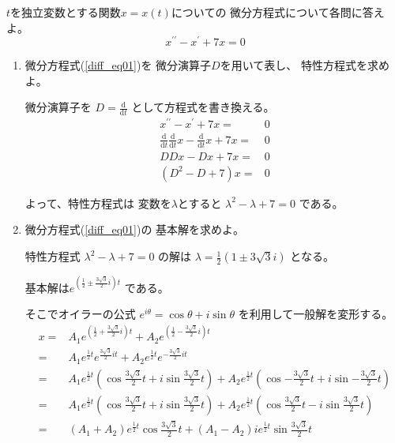 \documentclass[12pt,b5paper]{ltjsarticle}
\begin{document}
$t$を独立変数とする関数$x=x(t)$についての
微分方程式について各問に答えよ。
\begin{equation}
 x^{\prime\prime}- x^{\prime}+7x=0
  \label{diff_eq01}
\end{equation}
\begin{enumerate}
 \item
      微分方程式(\ref{diff_eq01})を
      微分演算子$D$を用いて表し、
      特性方程式を求めよ。

      \dotfill

      微分演算子を
      $D=\frac{\mathrm{d}}{\mathrm{d}t}$
      として方程式を書き換える。
      \begin{align}
       x^{\prime\prime}- x^{\prime}+7x =& 0\\
       \frac{\mathrm{d}}{\mathrm{d}t}\frac{\mathrm{d}}{\mathrm{d}t}x
       -\frac{\mathrm{d}}{\mathrm{d}t}x
       +7x =& 0\\
       DDx-Dx+7x =& 0\\
       (D^2-D+7)x =& 0
      \end{align}

      よって、特性方程式は
      変数を$\lambda$とすると
      $\lambda^2-\lambda+7 = 0$
      である。

      \hrulefill

 \item
      微分方程式(\ref{diff_eq01})の
      基本解を求めよ。

      \dotfill

      特性方程式
      $\lambda^2-\lambda+7 = 0$
      の解は
      $\lambda=\frac{1}{2}\left( 1\pm 3\sqrt{3}i \right)$
      となる。

      基本解は$e^{\left(\frac{1}{2} \pm \frac{3\sqrt{3}}{2}i\right)t}$
      である。

      そこでオイラーの公式
      $e^{i\theta}=\cos{\theta}+i\sin{\theta}$
      を利用して一般解を変形する。
      \begin{align}
       x =& A_1e^{\left(\frac{1}{2} + \frac{3\sqrt{3}}{2}i\right)t}
        +A_2e^{\left(\frac{1}{2} - \frac{3\sqrt{3}}{2}i\right)t}\\
       =& A_1e^{\frac{1}{2}t}e^{\frac{3\sqrt{3}}{2}it}
       + A_2e^{\frac{1}{2}t}e^{-\frac{3\sqrt{3}}{2}it}\\
       =& A_1e^{\frac{1}{2}t}\left(\cos{\frac{3\sqrt{3}}{2}t}+i\sin{\frac{3\sqrt{3}}{2}t}\right)
       +  A_2e^{\frac{1}{2}t}\left(\cos{-\frac{3\sqrt{3}}{2}t}+i\sin{-\frac{3\sqrt{3}}{2}t}\right)\\
       =& A_1e^{\frac{1}{2}t}\left(\cos{\frac{3\sqrt{3}}{2}t}+i\sin{\frac{3\sqrt{3}}{2}t}\right)
       +  A_2e^{\frac{1}{2}t}\left(\cos{\frac{3\sqrt{3}}{2}t}-i\sin{\frac{3\sqrt{3}}{2}t}\right)\\
       =& (A_1+A_2)e^{\frac{1}{2}t}\cos{\frac{3\sqrt{3}}{2}t}
       +(A_1-A_2)ie^{\frac{1}{2}t}\sin{\frac{3\sqrt{3}}{2}t}
       \label{kai}
      \end{align}


\end{enumerate}
\end{document}
